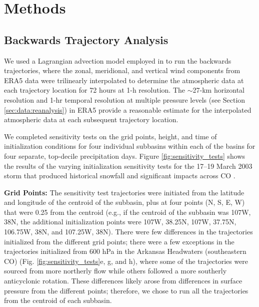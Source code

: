 \documentclass[draft]{agujournal2019}
\begin{document}
\section{Methods}
\label{sec:methods}
\subsection{Backwards Trajectory Analysis}

We used a Lagrangian advection model employed in  to run the backwards trajectories, where the zonal, meridional, and vertical wind components from ERA5 data were trilinearly interpolated to determine the atmospheric data at each trajectory location for 72 hours at 1-h resolution. The $\sim$27-km horizontal resolution and 1-hr temporal resolution at multiple pressure levels (see Section \ref{sec:data:reanalysis}) in ERA5 provide a reasonable estimate for the interpolated atmospheric data at each subsequent trajectory location.

We completed sensitivity tests on the grid points, height, and time of initialization conditions for four individual subbasins within each of the basins for four separate, top-decile precipitation days. Figure \ref{fig:sensitivity_tests} shows the results of the varying initialization sensitivity tests for the 17--19 March 2003 storm that produced historical snowfall and significant impacts across CO \cite{Wesley2013Extreme2003}.

\textbf{Grid Points:} The sensitivity test trajectories were initiated from the latitude and longitude of the centroid of the subbasin, plus at four points (N, S, E, W) that were 0.25\textdegree{} from the centroid (e.g., if the centroid of the subbasin was 107\textdegree W, 38\textdegree N, the additional initialization points were 107\textdegree W, 38.25\textdegree N, 107\textdegree W, 37.75\textdegree N, 106.75\textdegree W, 38\textdegree N, and 107.25\textdegree W, 38\textdegree N). There were few differences in the trajectories initialized from the different grid points; there were a few exceptions in the trajectories initialized from 600 hPa in the Arkansas Headwaters (southeastern CO) (Fig. \ref{fig:sensitivity_tests}e, g, and h), where some of the trajectories were sourced from more northerly flow while others followed a more southerly anticyclonic rotation. These differences likely arose from differences in surface pressure from the different points; therefore, we chose to run all the trajectories from the centroid of each subbasin.
\end{document}
